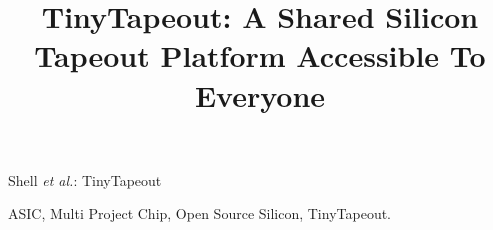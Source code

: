 \documentclass[journal]{IEEEtran}
\begin{document}
\title{TinyTapeout: A Shared Silicon Tapeout Platform Accessible To Everyone}



%
{Shell \MakeLowercase{\textit{et al.}}: TinyTapeout}


\maketitle


\begin{IEEEkeywords}
ASIC, Multi Project Chip, Open Source Silicon, TinyTapeout.
\end{IEEEkeywords}











%






\end{document}
